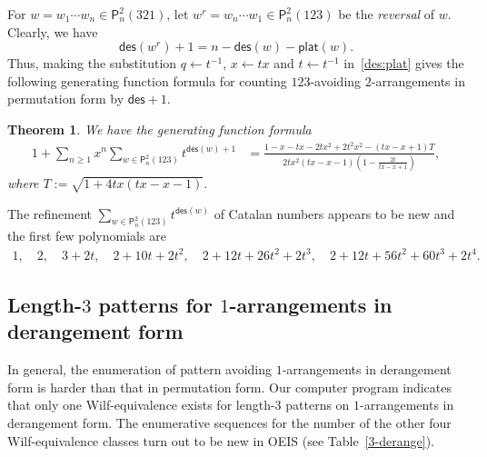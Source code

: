 \documentclass[12pt]{amsart} %
\numberwithin{equation}{section}
\theoremstyle{plain}
\newtheorem{theorem}{Theorem}[section]
\theoremstyle{definition}
\renewcommand\P{\mathsf{P}}
\def\plat{\mathsf{plat}}
\def\des{\mathsf{des}}
\begin{document}
For  $w=w_1\cdots w_n\in\P_n^2(321)$, let $w^r=w_n\cdots w_1\in\P_n^2(123)$ be the {\em reversal} of $w$. Clearly, we have 
$$
\des(w^r)+1=n-\des(w)-\plat(w). 
$$
Thus, making the substitution $q\leftarrow t^{-1}$, $x\leftarrow tx$ and $t\leftarrow t^{-1}$ in~\eqref{des:plat}  gives the following generating function formula for counting $123$-avoiding $2$-arrangements in permutation form by $\des+1$. 
\begin{theorem}
We have the generating function formula
\begin{align}\label{123:2des}
1+\sum_{n\geq1}x^n\sum_{w\in\P_n^2(123)} t^{\des(w)+1} &=\frac{1-x-tx-2tx^2+2t^2x^2-(tx-x+1)T}{2tx^2(tx-x-1)(1-\frac{2t}{tx-x+1})},
\end{align}
where $T:=\sqrt{1+4tx(tx-x-1)}$.
\end{theorem}
The refinement $\sum_{w\in\P_n^2(123)} t^{\des(w)}$ of Catalan numbers appears to be new and the first few polynomials are
\begin{align*}
1,\quad2,\quad3+2t,\quad2+10t+2t^2, \quad2+12t+26t^2+2t^3,\quad 2+12t+56t^2+60t^3+2t^4. 
\end{align*}

\subsection{\texorpdfstring{Length-$3$ patterns for $1$-arrangements}{Length-3 patterns for 1-arrangements} in derangement form}%

In general, the enumeration  of pattern avoiding $1$-arrangements in derangement form is harder than that in permutation form. Our computer program indicates that only one Wilf-equivalence exists for length-$3$ patterns on 
$1$-arrangements in derangement form. The enumerative sequences for the number of the other four Wilf-equivalence classes turn out to be new in OEIS (see Table~\ref{3-derange}). 
\end{document}
